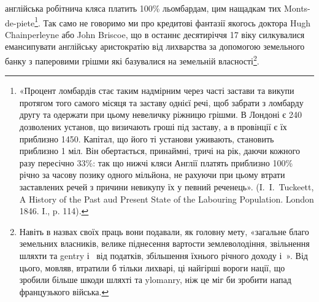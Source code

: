 \parcont{}  %
англійська робітнича кляса платить 100\% льомбардам, цим нащадкам тих Monts-de-piete\footnote{
«Процент ломбардів стає таким надмірним через часті застави та викупи протягом того
самого місяця та заставу однієї речі, щоб забрати з ломбарду другу та одержати при цьому невеличку
ріжницю грішми. В Лондоні є 240 дозволених установ, що визичають гроші під заставу, а в провінції
є їх приблизно 1450. Капітал, що його ті установи уживають, становить приблизно 1 міл. Він
обертається,
принаймні, тричі на рік, даючи кожного разу пересічно 33\%: так що нижчі кляси
Англії платять приблизно 100\% річно за часову позику одного мільйона, не рахуючи при цьому втрати
заставлених речей з причини невикупу їх у певний реченець». (I.~I.~Tuckeett, A History of the Past
aud Present State of the Labouring Population. London 1846. I., p. 114).
}.
Так само не говоримо ми про кредитові фантазії якогось доктора
Hugh Chainperleyne або John Briscoe, що в останнє десятиріччя 17 віку силкувалися
емансипувати англійську аристократію від лихварства за допомогою
земельного банку з паперовими грішми які базувалися на земельній власності\footnote{
Навіть в назвах своїх праць вони подавали, як головну мету, «загальне благо земельних
власників, велике піднесення вартости землеволодіння, звільнення шляхти та gentry і~ від
податків,
збільшення їхнього річного доходу і~». Від цього, мовляв, втратили б тільки лихварі, ці
найгірші
вороги нації, що зробили більше шкоди шляхті та ylomanry, ніж це міг би зробити напад французького
війська.
}.

